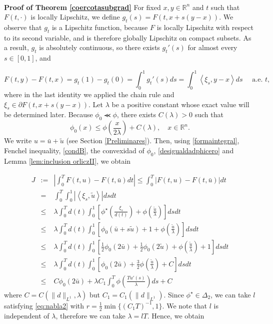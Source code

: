 \documentclass[twoside]{article}
\theoremstyle{definition}
\theoremstyle{plain}
\theoremstyle{remark}
\begin{document}
\vphantom{a}\\

\noindent \textbf{Proof of Theorem \ref{coercotasubgrad}}
For fixed $ x, y \in \mathbb{R}^n $ and $ t $ such that $ F(t, \cdot) $ is locally Lipschitz, we define
$
g_t(s) = F(t, x + s(y - x)).
$
We observe that $ g_t $ is a Lipschitz function, because $ F $ is locally Lipschitz with respect to its second variable, and is therefore globally Lipschitz on compact subsets.
As a result, $ g_t $ is absolutely continuous, so there exists $ g_t'(s) $ for almost every $ s \in [0,1] $, and


\begin{equation}\label{formaintegral}
 F(t,y)-F(t,x)=g_t(1)-g_t(0)=\int_0^1g_t'(s)ds=\int_0^1 \left<\xi_s,y-x\right>ds \quad \text{ a.e. } t,
\end{equation}
where in the last identity we applied the chain rule and $\xi_s \in \partial F(t,x+s(y-x))$.
Let $\lambda$ be a positive constant whose exact value will be determined later. Because  $\phi_0 \llcurly \phi$, there exists $C(\lambda)>0$ such that
\begin{equation}\label{desigualdadphicero}
 \phi_0(x)\leq \phi \left(\frac{x}{2\lambda}\right)+C(\lambda), \quad x\in \mathbb{R}^n.
\end{equation}
We write $u=\bar{u}+\tilde{u}$ (see Section \ref{Preliminares}). Then,
using \eqref{formaintegral}, Fenchel inequality,  \ref{condB}, the convexidad of $\phi_0$, \eqref{desigualdadphicero}
and Lemma \ref{lem:inclusion orliczII}, we obtain

\begin{eqnarray*}
J&:=&\left|\int_0^T F(t,u)-F(t,\bar{u})dt\right|\leq\int_0^T|F(t,u)-F(t,\bar{u})|dt\\
&=&\int_0^T\int_0^1 \left|\left<\xi_s,\tilde{u}\right>\right|ds dt\\
&\leq& \lambda \int_0^T d(t)\int_0^1 \left[\phi^\star\left(\frac{\xi_s}{d(t)}\right)+\phi \left(\frac{\tilde{u}}{\lambda}\right)\right]ds dt\\
&\leq& \lambda \int_0^T d(t)\int_0^1\left[\phi_0(\bar{u}+s\tilde{u})+1+\phi \left(\frac{\tilde{u}}{\lambda}\right)\right]ds dt\\
&\leq& \lambda \int_0^Td(t)\int_0^1\left[ \frac{1}{2}\phi_0(2\bar{u})+\frac{1}{2}\phi_0(2\tilde{u})+\phi \left(\frac{\tilde{u}}{\lambda}\right)+1\right]ds dt\\
&\leq& \lambda \int_0^Td(t)\int_0^1\left[ \phi_0(2\bar{u})+\frac{3}{2}\phi \left(\frac{\tilde{u}}{\lambda}\right)+C\right]ds dt\\
&\leq& C \phi_0(2\bar{u})+\lambda C_1\int_0^T\phi\left(\frac{Tu'(s)}{\lambda}\right)ds +C
\end{eqnarray*}
where $C = C(\|d\|_{L^1}, \lambda)$ but $C_1 = C_1(\|d\|_{L^1})$. Since $\phi^\star \in \Delta_2$, we can take $l$ satisfying \eqref{eq:nabla2} with $r = \frac{1}{2} \min\{(C_1 T)^{-1}, 1\}$. We note that $l$ is independent of $\lambda$, therefore we can take  $\lambda = lT$. Hence, we obtain
\end{document}

